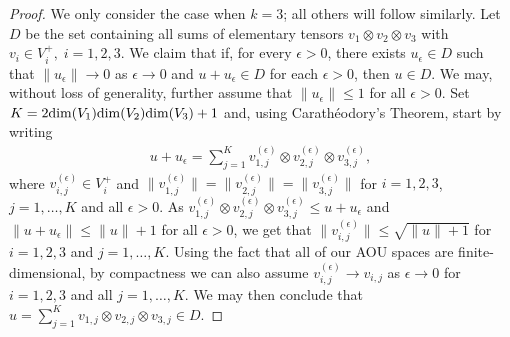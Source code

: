 \documentclass[11pt]{amsart}
\begin{document}
\begin{proof}
We only consider the case when $k = 3$; all others will follow similarly. Let $D$ be the set containing all sums of elementary tensors $v_{1}\otimes v_{2}\otimes v_{3}$ with $v_{i} \in V_{i}^{+}, \; i = 1, 2, 3$. We claim that if, for every $\epsilon > 0$, there exists $u_{\epsilon} \in D$ such that $\|u_{\epsilon}\|\rightarrow 0$ as $\epsilon \rightarrow 0$ and $u+u_{\epsilon} \in D$ for each $\epsilon > 0$, then $u \in D$. We may, without loss of generality, further assume that $\|u_{\epsilon}\| \leq 1$ for all $\epsilon > 0$. Set $K = 2{\rm dim}(V_{1}){\rm dim}(V_{2}){\rm dim}(V_{3})+1$ and, using Carathéodory's Theorem, start by writing
\begin{gather*}
	u+u_{\epsilon} = \sum\limits_{j=1}^{K}v_{1, j}^{(\epsilon)}\otimes v_{2, j}^{(\epsilon)}\otimes v_{3, j}^{(\epsilon)},
\end{gather*}
\noindent where $v_{i, j}^{(\epsilon)} \in V_{i}^{+}$ and $\|v_{1, j}^{(\epsilon)}\| = \|v_{2, j}^{(\epsilon)}\| = \|v_{3, j}^{(\epsilon)}\|$ for $i = 1, 2, 3$, $j = 1, \hdots, K$ and all $\epsilon > 0$. As $v_{1, j}^{(\epsilon)}\otimes v_{2, j}^{(\epsilon)} \otimes v_{3, j}^{(\epsilon)} \leq u+u_{\epsilon}$ and $\|u+u_{\epsilon}\| \leq \|u\|+1$ for all $\epsilon > 0$, we get that $\|v_{i, j}^{(\epsilon)}\| \leq \sqrt{\|u\|+1}$ for $i = 1, 2, 3$ and $j = 1, \hdots, K$. Using the fact that all of our AOU spaces are finite-dimensional, by compactness we can also assume $v_{i, j}^{(\epsilon)} \rightarrow v_{i, j}$ as $\epsilon \rightarrow 0$ for $i = 1, 2, 3$ and all $j = 1, \hdots, K$. We may then conclude that $u = \sum_{j=1}^{K}v_{1, j}\otimes v_{2, j}\otimes v_{3, j} \in D$.


\end{proof}
\end{document}
